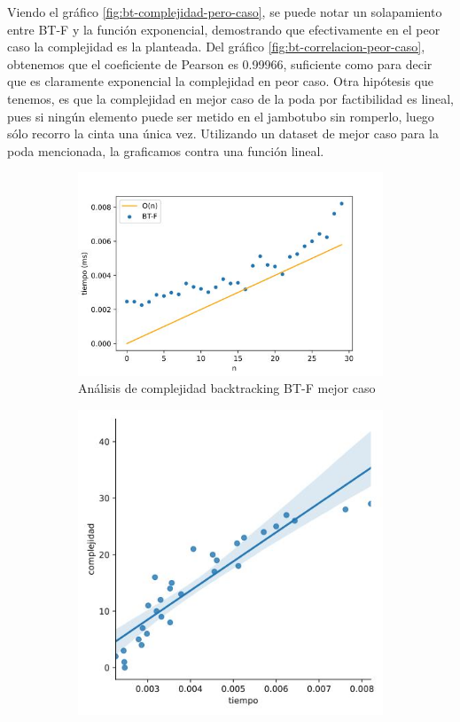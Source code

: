 \documentclass[10pt,a4paper]{article}
\begin{document}
\newline
Viendo el gráfico \ref{fig:bt-complejidad-pero-caso}, se puede notar un solapamiento entre BT-F y la función exponencial, demostrando que efectivamente en el peor caso la complejidad es la planteada.
Del gráfico \ref{fig:bt-correlacion-peor-caso}, obtenemos que el coeficiente de Pearson es 0.99966, suficiente como para decir que es claramente exponencial la complejidad en peor caso.
Otra hipótesis que tenemos, es que la complejidad en mejor caso de la poda por factibilidad es lineal, pues si ningún elemento puede ser metido en el jambotubo sin romperlo, luego sólo recorro la cinta una única vez. Utilizando un dataset de mejor caso para la poda mencionada, la graficamos contra una función lineal.
\newline
\begin{figure}[h!]
\begin{subfigure}{0.4\linewidth}
	\centering
		\includegraphics[scale=0.30]{img/bt-complejidad-mejor-caso.jpg}
		\caption{Análisis de complejidad backtracking BT-F mejor caso}
		\label{fig:bt-complejidad-mejor-caso}
\end{subfigure}
\begin{subfigure}{0.4\linewidth}
	\centering
		\includegraphics[scale=0.30]{img/bt-correlacion-mejor-caso.jpg}

\end{subfigure}
\end{figure}
\end{document}
